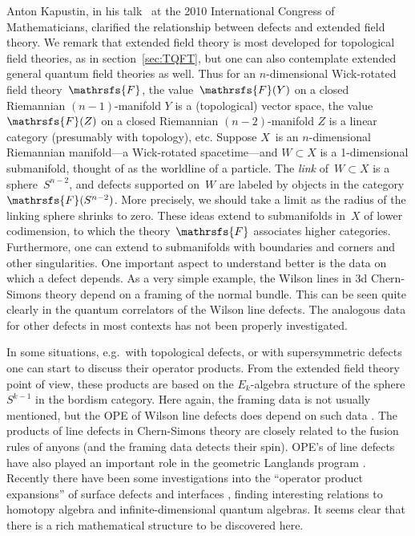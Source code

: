 \documentclass[12pt]{article}
\begin{document}
 
Anton Kapustin, in his talk~\cite[\S2]{Ka1} at the 2010 International
Congress of Mathematicians, clarified the relationship between defects and
extended field theory.  We remark that extended field theory is most
developed for topological field theories, as in section~\ref{sec:TQFT}, but
one can also contemplate extended general quantum field theories as well.  
Thus for
an $n$-dimensional Wick-rotated field theory~$\mathrsfs{F}$, the
value~$\mathrsfs{F}(Y)$ on a closed Riemannian $(n-1)$-manifold $Y$ is a
(topological) vector space, the value~$\mathrsfs{F}(Z)$ on a closed
Riemannian $(n-2)$-manifold $Z$ is a linear category (presumably with
topology), etc.  Suppose $X$~is an $n$-dimensional Riemannian manifold---a
Wick-rotated spacetime---and $W\subset X$ is a 1-dimensional submanifold,
thought of as the worldline of a particle.  The \emph{link} of~$W\subset X$
is a sphere~$S^{n-2}$, and defects supported on~$W$ are labeled by objects
in the category~$\mathrsfs{F}(S^{n-2})$.  More precisely, we should
take a limit as the radius of the linking sphere shrinks to zero.    These ideas extend to submanifolds
in~$X$ of lower codimension, to which the theory~$\mathrsfs{F}$ associates
higher categories.  Furthermore, one can extend to submanifolds with
boundaries and corners and other singularities.
One important aspect to understand better is the data on which a defect depends.
As a very simple example, the Wilson lines in 3d Chern-Simons theory depend on a
framing of the normal bundle. This can be seen quite clearly in the quantum correlators
of the Wilson line defects. The analogous data for other defects in most
contexts has not been properly investigated.



 In some situations, e.g.~with topological defects, or with supersymmetric
defects one can start to discuss their operator products.
From the extended field theory point of view, these products are based on the $E_k$-algebra structure of the sphere $S^{k-1}$ in the bordism category.
Here again, the framing data is not usually mentioned, 
but the OPE of Wilson line defects does depend on
such data \cite{MooreTASI}. The products of
line defects in Chern-Simons theory are closely related to the fusion rules of
anyons (and the framing data detects their spin). OPE's of line defects
 have also played an important role in the geometric Langlands program \cite{Kapustin:2006pk}.
Recently there have been some investigations into the
 ``operator product expansions'' of surface defects
 \cite{Gaiotto:2015aoa} and interfaces \cite{Dedushenko:2021mds}, finding interesting relations to homotopy
 algebra and infinite-dimensional quantum algebras. It seems clear that there is a
 rich mathematical structure to be discovered here.
\end{document}
